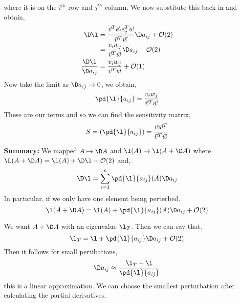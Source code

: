 where it is on the $i^{th}$ row and $j^{th}$ column. We now substitute this back in and obtain,
\begin{align*}
  \D \l &= \frac{\vec v^T \vec e_i \vec e_j^T \vec w}{\vec v^T \vec w}\D a_{ij} + \mathcal{O}(2) \\
  &= \frac{v_i w_j}{\vec v^T\vec w}\D a_{ij} + \mathcal{O}(2) \\
  \frac{\D \l}{\D a_{ij}} &= \frac{v_i w_j}{\vec v^T\vec w} + \mathcal{O}(1)
\end{align*}
Now take the limit as $\D a_{ij} \to 0$, we obtain,
$$ \pd{\l}{a_{ij}} = \frac{v_i w_j}{\vec v^T \vec w} $$
These are our terms and so we can find the sensitivity matrix,
$$ S = \left( \pd{\l}{a_{ij}} \right) = \frac{\vec v \vec w^T}{\vec v^T \vec w} $$

\textbf{Summary:} We mapped $A \mapsto \D A$ and $\l(A) \mapsto \l(A + \D A)$ where $\L(A + \D A) = \l(A) + \D\l + \mathcal{O}(2)$ and,
$$ \D \l = \sum_{i=1}^n \pd{\l}{a_{ij}}(A)\D a_{ij} $$
In particular, if we only have one element being perterbed,
$$ \l(A + \D A) = \l(A) + \pd{\l}{a_{ij}}(A)\D a_{ij} + \mathcal{O}(2) $$

\noindent
We want $A + \D A$ with an eigenvalue $\l_T$. Then we can say that,
$$ \l_T = \l + \pd{\l}{a_{ij}}\D a_{ij} + \mathcal{O}(2) $$
Then it follows for small pertibations,
$$ \D a_{ij} \approx \frac{\l_T - \l}{\pd{\l}{a_{ij}}} $$
this is a linear approximation. We can choose the smallest perturbation after calculating the partial derivatives.


